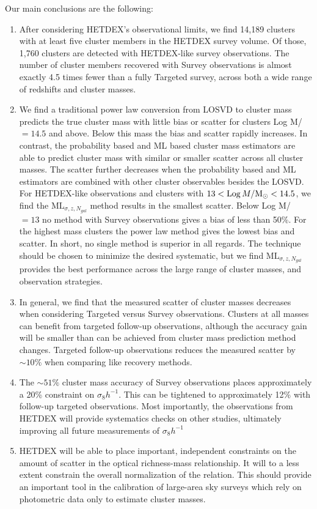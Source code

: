 Our main conclusions are the following:
\begin{enumerate}
	\item After considering HETDEX's observational limits, we find 14,189 clusters with at least five cluster members in the HETDEX survey volume. Of those, 1,760 clusters are detected with HETDEX-like survey observations. The number of cluster members recovered with Survey observations is almost exactly 4.5 times fewer than a fully Targeted survey, across both a wide range of redshifts and cluster masses.
	
	\item We find a traditional power law conversion from LOSVD to cluster mass predicts the true cluster mass with little bias or scatter for clusters Log M/\Msol\ $=14.5$ and above. Below this mass the bias and scatter rapidly increases. In contrast, the probability based and ML based cluster mass estimators are able to predict cluster mass with similar or smaller scatter across all cluster masses. The scatter further decreases when the probability based and ML estimators are combined with other cluster observables besides the LOSVD. For HETDEX-like observations and clusters with $13 < \mathrm{Log}\, M/\hbox{$\mathrm{M}_\odot$} <14.5$, we find the $\mathrm{ML}_{\sigma, z, N_{gal}}$ method results in the smallest scatter. Below Log M/\Msol\ $=13$ no method with Survey observations gives a bias of less than 50\%. For the highest mass clusters the power law method gives the lowest bias and scatter. In short, no single method is superior in all regards. The technique should be chosen to minimize the desired systematic, but we find $\mathrm{ML}_{\sigma, z, N_{gal}}$ provides the best performance across the large range of cluster masses, and observation strategies.
	
	\item In general, we find that the measured scatter of cluster masses decreases when considering Targeted versus Survey observations. Clusters at all masses can benefit from targeted follow-up observations, although the accuracy gain will be smaller than can be achieved from cluster mass prediction method changes. Targeted follow-up observations reduces the measured scatter by $\sim10\%$ when comparing like recovery methods.
	
	\item The $\sim51\%$ cluster mass accuracy of Survey observations places approximately a 20\% constraint on $\sigma_8 h^{-1}$. This can be tightened to approximately 12\% with follow-up targeted observations. Most importantly, the observations from HETDEX will provide systematics checks on other studies, ultimately improving all future measurements of $\sigma_8 h^{-1}$
	
	\item HETDEX will be able to place important, independent constraints on the amount of scatter in the optical richness-mass relationship. It will to a less extent constrain the overall normalization of the relation. This should provide an important tool in the calibration of large-area sky surveys which rely on photometric data only to estimate cluster masses.
\end{enumerate}